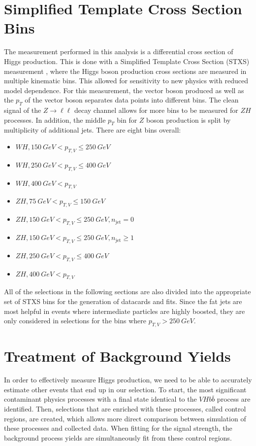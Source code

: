 \section{Simplified Template Cross Section Bins}

The measurement performed in this analysis is a differential
cross section of Higgs production.
This is done with a Simplified Template Cross Section (STXS) measurement \cite{Kato:2687920},
where the Higgs boson production cross sections are measured in multiple kinematic bins.
This allowed for sensitivity to new physics with reduced model dependence.
For this measurement, the vector boson produced as well as the $p_T$ of the vector boson
separates data points into different bins.
The clean signal of the $Z\rightarrow\ell\ell$ decay channel allows for more
bins to be measured for $ZH$ processes.
In addition, the middle $p_T$ bin for $Z$ boson production is split by multiplicity
of additional jets.
There are eight bins overall:
\begin{itemize}
\item $WH, \SI{150}{GeV} < p_{T,V} \le \SI{250}{GeV}$
\item $WH, \SI{250}{GeV} < p_{T,V} \le \SI{400}{GeV}$
\item $WH, \SI{400}{GeV} < p_{T,V}$
\item $ZH, \SI{75}{GeV} < p_{T,V} \le \SI{150}{GeV}$
\item $ZH, \SI{150}{GeV} < p_{T,V} \le \SI{250}{GeV}, n_\mathrm{jet} = 0$
\item $ZH, \SI{150}{GeV} < p_{T,V} \le \SI{250}{GeV}, n_\mathrm{jet} \ge 1$
\item $ZH, \SI{250}{GeV} < p_{T,V} \le \SI{400}{GeV}$
\item $ZH, \SI{400}{GeV} < p_{T,V}$
\end{itemize}
All of the selections in the following sections are also divided into the appropriate
set of STXS bins for the generation of datacards and fits.
Since the fat jets are most helpful in events where
intermediate particles are highly boosted,
they are only considered in selections for the bins where $p_{T,V} > \SI{250}{GeV}$.

\section{Treatment of Background Yields}

In order to effectively measure Higgs production,
we need to be able to accurately estimate other events
that end up in our selection.
To start, the most significant contaminant physics processes with a final state
identical to the $V\!Hb\bar{b}$ process are identified.
Then, selections that are enriched with these processes, called control regions, are created,
which allows more direct comparison between simulation of these processes and collected data.
When fitting for the signal strength, the background process yields are simultaneously fit
from these control regions.


